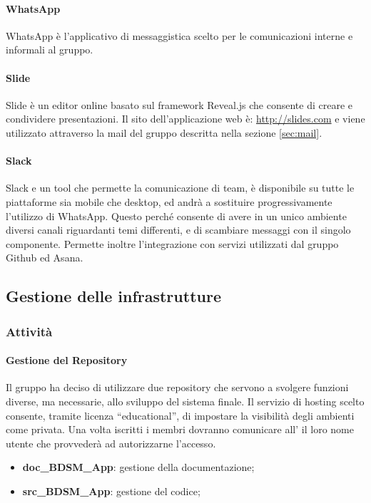 			\paragraph{WhatsApp}
			WhatsApp è l'applicativo di messaggistica scelto per le comunicazioni interne e informali al gruppo.
			\paragraph{Slide}
			Slide è un editor online basato sul framework Reveal.js che consente di creare e condividere presentazioni. \newline
			Il sito dell'applicazione web è: \url{http://slides.com} e viene utilizzato attraverso la mail del gruppo descritta nella sezione \ref{sec:mail}.
			\paragraph{Slack}
			Slack e un tool che permette la comunicazione di team, è disponibile su tutte le piattaforme sia mobile che desktop, ed andrà a sostituire progressivamente l'utilizzo di WhatsApp. Questo perché consente di avere in un unico ambiente diversi canali riguardanti temi differenti, e di scambiare messaggi con il singolo componente. Permette inoltre l'integrazione con servizi utilizzati dal gruppo Github ed Asana. 


	\subsection{Gestione delle infrastrutture}
	
		\subsubsection{Attività}
			\paragraph{Gestione del Repository}
			Il gruppo ha deciso di utilizzare due repository che servono a svolgere funzioni diverse, ma necessarie, allo sviluppo del sistema finale. \newline
			Il servizio di hosting scelto consente, tramite licenza ``educational'', di impostare la visibilità degli ambienti come privata. \newline
			Una volta iscritti i membri dovranno comunicare all'\roleAdministrator{} il loro nome utente che provvederà ad autorizzarne l'accesso.
				\begin{itemize}
					\item \textbf{doc\_BDSM\_App}: gestione della documentazione;
					\item \textbf{src\_BDSM\_App}: gestione del codice;
				\end{itemize}
